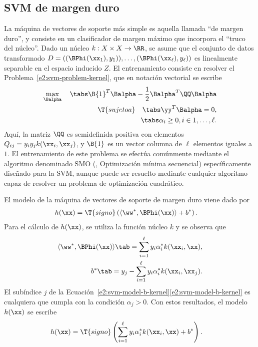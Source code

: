 %
%
\subsection{SVM de margen duro}
%
La máquina de vectores de soporte más simple es aquella llamada ``de
margen duro'', y consiste en un clasificador de margen máximo que
incorpora el ``truco del núcleo''.
Dado un núcleo $k:X\times{}X\rightarrow\RR$, se asume que el conjunto
de datos transformado
$D=\left((\BPhi(\xx_1),y_1)),\ldots,(\BPhi(\xx_\ell),y_\ell)\right)$ es
linealmente separable en el espacio inducido $Z$.
El entrenamiento consiste en resolver el
Problema~\ref{e2:svm-problem-kernel}, que en notación vectorial se
escribe
%
\begin{equation}\label{e2:svm-hard-margin}
  \begin{aligned}
    \max_{\Balpha}\quad\tabs
      \B{1}^T\Balpha-\frac{1}{2}\Balpha^T\QQ\Balpha\\
    \T{sujeto a} \quad\tabs
      \yy^T\Balpha = 0, \\
      \tabs \alpha_i\geq 0,  i\in {1,\ldots,\ell }.
  \end{aligned}
\end{equation}
%
Aquí, la matriz $\QQ$ es semidefinida positiva con elementos
$Q_{ij}=y_iy_jk(\xx_i,\xx_j)$, y $\B{1}$ es un vector columna de
$\ell$ elementos iguales a $1$.
El entrenamiento de este problema se efectúa comúnmente mediante el
algoritmo denominado SMO (,
Optimización mínima secuencial) \cite{smo} específicamente diseñado
para la SVM, aunque puede ser resuelto mediante cualquier algoritmo
capaz de resolver un problema de optimización cuadrático.

El modelo de la máquina de vectores de soporte de margen
duro viene dado por
%
\begin{align}\label{e2:svm-model-hard0}
    h(\xx) &= \T{signo}\left(\langle\ww^*,\BPhi(\xx)\rangle+b^*\right).
\end{align}
%
Para el cálculo de $h(\xx)$, se utiliza la función núcleo $k$ y se
observa que
%
\begin{align}
  \langle\ww^*,\BPhi(\xx)\rangle \tab=
  \sum_{i=1}^\ell{}y_i\alpha^*_ik(\xx_i,\xx),\\
  b^* \tab= y_j - \sum_{i=1}^\ell{}y_i\alpha^*_ik(\xx_i,\xx_j).
  \label{e2:svm-model-b-kernel}
\end{align}
%
El subíndice $j$ de la
\iflatexml{}Ecuación~\ref{e2:svm-model-b-kernel}\else\autoref{e2:svm-model-b-kernel}\fi{}
es cualquiera que cumpla con la condición $\alpha_j>0$.
Con estos resultados, el modelo $h(\xx)$ se escribe
%
\begin{align}
  h(\xx) &=
  \T{signo}\left(\sum_{i=1}^\ell{}y_i\alpha^*_ik(\xx_i,\xx)+b^*\right).
\label{e2:svm-model-hard}
\end{align}
%
